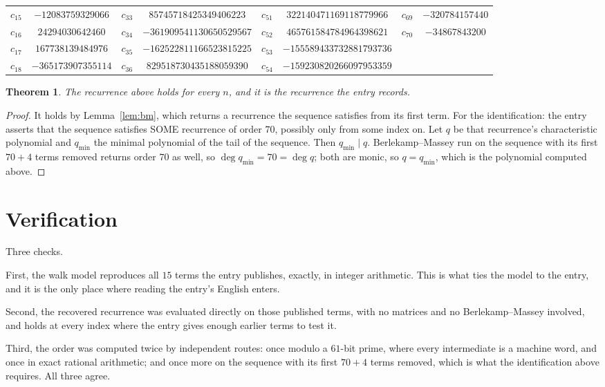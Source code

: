 \documentclass[11pt,a4paper]{article}
\theoremstyle{plain}
\newtheorem{theorem}{Theorem}
\theoremstyle{definition}
\begin{document}
\begin{center}
\begin{tabular}{cccccccc}
$c_{15}$ & $-12083759329066$ & $c_{33}$ & $85745718425349406223$ & $c_{51}$ & $322140471169118779966$ & $c_{69}$ & $-320784157440$ \\
$c_{16}$ & $24294030642460$ & $c_{34}$ & $-361909541130650529567$ & $c_{52}$ & $465761584784964398621$ & $c_{70}$ & $-34867843200$ \\
$c_{17}$ & $167738139484976$ & $c_{35}$ & $-162522811166523815225$ & $c_{53}$ & $-155589433732881793736$ &  &  \\
$c_{18}$ & $-365173907355114$ & $c_{36}$ & $829518730435188059390$ & $c_{54}$ & $-159230820266097953359$ &  &  \\
\end{tabular}
\end{center}

\begin{theorem}
The recurrence above holds for every $n$, and it is the recurrence the entry records.
\end{theorem}

\begin{proof}
It holds by Lemma~\ref{lem:bm}, which returns a recurrence the sequence satisfies from its
first term. For the identification: the entry asserts that the sequence satisfies SOME
recurrence of order $70$, possibly only from some index on. Let $q$ be that recurrence's
characteristic polynomial and $q_{\min}$ the minimal polynomial of the tail of the sequence.
Then $q_{\min}\mid q$. Berlekamp--Massey run on the sequence with its first $70+4$ terms
removed returns order $70$ as well, so $\deg q_{\min}=70=\deg q$; both are monic, so
$q=q_{\min}$, which is the polynomial computed above.
\end{proof}

\section{Verification}

Three checks.

First, the walk model reproduces all $15$ terms the entry publishes, exactly, in integer
arithmetic. This is what ties the model to the entry, and it is the only place where reading
the entry's English enters.

Second, the recovered recurrence was evaluated directly on those published terms, with no
matrices and no Berlekamp--Massey involved, and holds at every index where the entry gives
enough earlier terms to test it.

Third, the order was computed twice by independent routes: once modulo a $61$-bit prime, where
every intermediate is a machine word, and once in exact rational arithmetic; and once more on
the sequence with its first $70+4$ terms removed, which is what the identification above
requires. All three agree.
\end{document}
